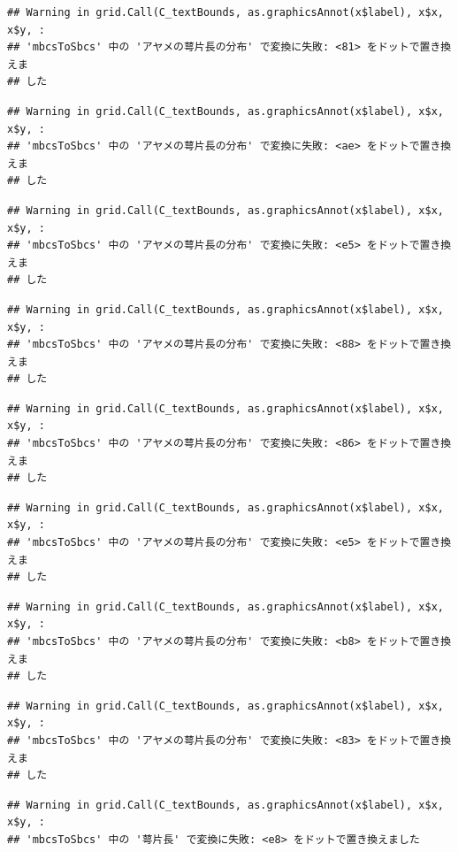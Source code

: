 \documentclass[
]{book}
\begin{document}
\begin{verbatim}
## Warning in grid.Call(C_textBounds, as.graphicsAnnot(x$label), x$x, x$y, :
## 'mbcsToSbcs' 中の 'アヤメの萼片長の分布' で変換に失敗: <81> をドットで置き換えま
## した
\end{verbatim}

\begin{verbatim}
## Warning in grid.Call(C_textBounds, as.graphicsAnnot(x$label), x$x, x$y, :
## 'mbcsToSbcs' 中の 'アヤメの萼片長の分布' で変換に失敗: <ae> をドットで置き換えま
## した
\end{verbatim}

\begin{verbatim}
## Warning in grid.Call(C_textBounds, as.graphicsAnnot(x$label), x$x, x$y, :
## 'mbcsToSbcs' 中の 'アヤメの萼片長の分布' で変換に失敗: <e5> をドットで置き換えま
## した
\end{verbatim}

\begin{verbatim}
## Warning in grid.Call(C_textBounds, as.graphicsAnnot(x$label), x$x, x$y, :
## 'mbcsToSbcs' 中の 'アヤメの萼片長の分布' で変換に失敗: <88> をドットで置き換えま
## した
\end{verbatim}

\begin{verbatim}
## Warning in grid.Call(C_textBounds, as.graphicsAnnot(x$label), x$x, x$y, :
## 'mbcsToSbcs' 中の 'アヤメの萼片長の分布' で変換に失敗: <86> をドットで置き換えま
## した
\end{verbatim}

\begin{verbatim}
## Warning in grid.Call(C_textBounds, as.graphicsAnnot(x$label), x$x, x$y, :
## 'mbcsToSbcs' 中の 'アヤメの萼片長の分布' で変換に失敗: <e5> をドットで置き換えま
## した
\end{verbatim}

\begin{verbatim}
## Warning in grid.Call(C_textBounds, as.graphicsAnnot(x$label), x$x, x$y, :
## 'mbcsToSbcs' 中の 'アヤメの萼片長の分布' で変換に失敗: <b8> をドットで置き換えま
## した
\end{verbatim}

\begin{verbatim}
## Warning in grid.Call(C_textBounds, as.graphicsAnnot(x$label), x$x, x$y, :
## 'mbcsToSbcs' 中の 'アヤメの萼片長の分布' で変換に失敗: <83> をドットで置き換えま
## した
\end{verbatim}

\begin{verbatim}
## Warning in grid.Call(C_textBounds, as.graphicsAnnot(x$label), x$x, x$y, :
## 'mbcsToSbcs' 中の '萼片長' で変換に失敗: <e8> をドットで置き換えました
\end{verbatim}
\end{document}
